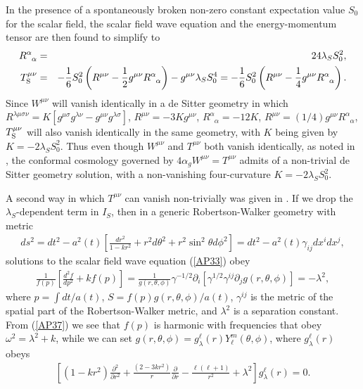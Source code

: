 \documentclass[aps]{revtex4}
\begin{document}
In the presence of a spontaneously broken non-zero constant expectation
value $S_0$ for the scalar field, the scalar field wave equation and the energy-momentum tensor are then found to simplify to  
%                                                                               
\begin{eqnarray}
R^\alpha_{\phantom{\alpha}\alpha}&=&24\lambda_S S_0^2,
\nonumber\\
T_{\rm S}^{\mu \nu}&=& 
-\frac{1}{6} S_0^2\left(R^{\mu\nu}-\frac{1}{2}g^{\mu\nu}
R^\alpha_{\phantom{\alpha}\alpha}\right)-g^{\mu\nu}\lambda_S S_0^4=-\frac{1}{6} S_0^2\left(R^{\mu\nu}-\frac{1}{4}g^{\mu\nu}
R^\alpha_{\phantom{\alpha}\alpha}\right).
\label{AP35}
\end{eqnarray}                                 
%  
Since $W^{\mu \nu}$ will vanish identically in a de Sitter geometry in which 
$R^{\lambda\mu\sigma\nu}=K[g^{\mu \sigma}g^{\lambda \nu}-g^{\mu \nu}g^{\lambda \sigma}]$, $R^{\mu\nu}=-3Kg^{\mu\nu}$, $R^\alpha_{\phantom{\alpha}\alpha}=-12K$, $R^{\mu\nu}=(1/4)g^{\mu\nu}
R^\alpha_{\phantom{\alpha}\alpha}$, $T_{\rm S}^{\mu \nu}$ will also  vanish identically in the same geometry, with $K$ being given by $K=-2\lambda_S S_0^2$. Thus even though $W^{\mu\nu}$ and $T^{\mu\nu}$ both vanish identically, as noted in \cite{Mannheim1990}, the conformal cosmology governed by $4\alpha_gW^{\mu\nu}=T^{\mu\nu}$ admits of a non-trivial de Sitter geometry solution, with a non-vanishing four-curvature $K=-2\lambda_S S_0^2$.

A second way in which $T^{\mu\nu}$ can vanish non-trivially was given in \cite{Mannheim2000}. If we drop the $\lambda_S$-dependent term in $I_S$, then in a generic Robertson-Walker geometry with metric
%
\begin{eqnarray}
ds^2=dt^2-a^2(t)\left[\frac{dr^2}{1-kr^2}+r^2d\theta^2+r^2\sin^2\theta d\phi^2\right]
=dt^2-a^2(t)\gamma_{ij}dx^idx^j,
\label{AP36}
\end{eqnarray}
%
solutions to the scalar field wave equation (\ref{AP33})  obey \cite{Mannheim2000}
%
\begin{eqnarray}
\frac{1}{f(p)}\left[\frac{d^2f}{dp^2}+kf(p)\right]=\frac{1}{g(r,\theta,\phi)}\gamma^{-1/2}\partial_i[\gamma^{1/2}\gamma^{ij}\partial_jg(r,\theta,\phi)]=-\lambda^2,
\label{AP37}
\end{eqnarray}
%
where $p=\int dt/a(t)$, $S=f(p)g(r,\theta,\phi)/a(t)$, $\gamma^{ij}$ is the metric of the spatial part of the Robertson-Walker metric, and $\lambda^2$ is a separation constant. From (\ref{AP37}) we see that $f(p)$ is harmonic with frequencies that obey $\omega^2=\lambda^2+k$, while we can set $g(r,\theta,\phi)=g^{\ell}_{\lambda}(r)Y^m_{\ell}(\theta,\phi)$, where $g^{\ell}_{\lambda}(r)$ obeys
%
\begin{eqnarray}
\left[(1-kr^2)\frac{\partial^2}{\partial r^2}+\frac{(2-3kr^2)}{r}\frac{\partial}{\partial r}-\frac{\ell(\ell+1)}{r^2}+\lambda^2\right]g^{\ell}_{\lambda}(r)=0.
\label{AP38}
\end{eqnarray}
%
\end{document}
